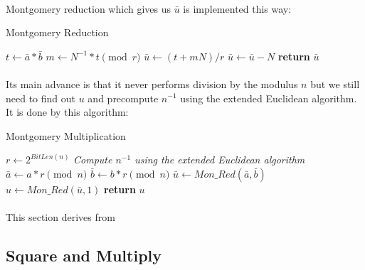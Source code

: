 \documentclass[thesis=B,english]{FITthesis}[2012/10/20]
\begin{document}
{{\paragraph*{}{
Montgomery reduction which gives us \(\bar{u}\) is implemented this way:
}

\begin{algorithm}[H]
\caption{Montgomery Reduction}
\begin{algorithmic}[1]
 \State $t \gets\bar{a} *\bar{b}$
 \State $m \gets N^{-1} * t \pmod{r}$
 \State $\bar{u} \gets (t + mN) / r$
  \State $\bar{u} \gets\bar{u} - N$
 \EndIf
\State \textbf{return} $\bar{u}$
\EndFunction
\end{algorithmic}
\end{algorithm}

\paragraph*{}
{
Its main advance is that it never performs division by the modulus \(n\) but we still need to find out \(u\) and precompute \(n^{-1}\) using the extended Euclidean algorithm.
It is done by this algorithm: }

\begin{algorithm}[H]
\caption{Montgomery Multiplication}
\begin{algorithmic}[1]
 \State $r \gets 2^{BitLen(n)}$
 \State \textit{Compute \(n^{-1}\) using the extended Euclidean algorithm}
 \State $\bar{a} \gets a *r \pmod{n}$
 \State $\bar{b} \gets b * r \pmod{n}$
 \State $\bar{u} \gets Mon\_Red(\bar{a}, \bar{b})$
 \State $u \gets Mon\_Red(\bar{u}, 1)$
 \State \textbf{return} $u$
\EndFunction
\end{algorithmic}
\end{algorithm}

\paragraph*{}{This section derives from \cite{koc2}}


\subsection{Square and Multiply}
}}
\end{document}
